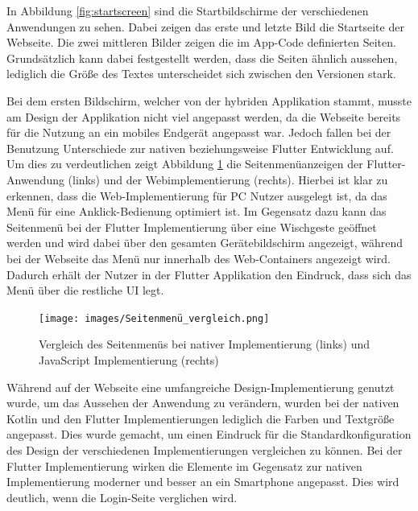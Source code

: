 In Abbildung \ref{fig:startscreen} sind die Startbildschirme der verschiedenen Anwendungen zu sehen. Dabei zeigen das erste und letzte Bild die Startseite der Webseite. Die zwei mittleren Bilder zeigen die im App-Code definierten Seiten. Grundsätzlich kann dabei festgestellt werden, dass die Seiten ähnlich aussehen, lediglich die Größe des Textes unterscheidet sich zwischen den Versionen stark.

Bei dem ersten Bildschirm, welcher von der hybriden Applikation stammt, musste am Design der Applikation nicht viel angepasst werden, da die Webseite bereits für die Nutzung an ein mobiles Endgerät angepasst war. Jedoch fallen bei der Benutzung Unterschiede zur nativen beziehungsweise Flutter Entwicklung auf. 
Um dies zu verdeutlichen zeigt Abbildung \ref{fig:sidemenu} die Seitenmenüanzeigen der Flutter-Anwendung (links) und der Webimplementierung (rechts). Hierbei ist klar zu erkennen, dass die Web-Implementierung für PC Nutzer ausgelegt ist, da das Menü für eine Anklick-Bedienung optimiert ist. 
Im Gegensatz dazu kann das Seitenmenü bei der Flutter Implementierung über eine Wischgeste geöffnet werden und wird dabei über den gesamten Gerätebildschirm angezeigt, während bei der Webseite das Menü nur innerhalb des Web-Containers angezeigt wird. Dadurch erhält der Nutzer in der Flutter Applikation den Eindruck, dass sich das Menü über die restliche UI legt. 
\begin{figure}[ht]
  \centering
  \texttt{[image: images/Seitenmenü\_vergleich.png]} 
  \caption[Vergleich des Seitenmenüs der nativen und hybriden Applikation]{Vergleich des Seitenmenüs bei nativer Implementierung (links) und JavaScript Implementierung (rechts)}
  \label{fig:sidemenu}
\end{figure}

Während auf der Webseite eine umfangreiche Design-Implementierung genutzt wurde, um das Aussehen der Anwendung zu verändern, wurden bei der nativen Kotlin und den Flutter Implementierungen lediglich die Farben und Textgröße angepasst. Dies wurde gemacht, um einen Eindruck für die Standardkonfiguration des Design der verschiedenen Implementierungen vergleichen zu können. Bei der Flutter Implementierung wirken die Elemente im Gegensatz zur nativen Implementierung moderner und besser an ein Smartphone angepasst. Dies wird deutlich, wenn die Login-Seite verglichen wird.

